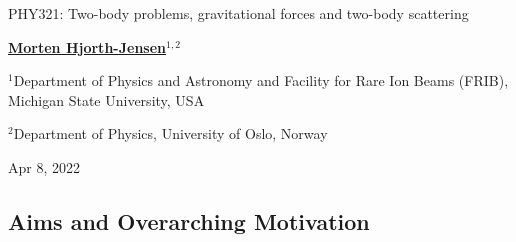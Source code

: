 \documentclass[%
oneside,                 %
final,                   %
10pt]{article}
\begin{document}

\newcommand{\exercisesection}[1]{\subsection*{#1}}






\thispagestyle{empty}

\begin{center}
{\LARGE\bf
\begin{spacing}{1.25}
PHY321: Two-body problems, gravitational forces and two-body scattering 
\end{spacing}
}
\end{center}


\begin{center}
{\bf \href{{http://mhjgit.github.io/info/doc/web/}}{Morten Hjorth-Jensen}${}^{1, 2}$} \\ [0mm]
\end{center}

\begin{center}
\centerline{{\small ${}^1$Department of Physics and Astronomy and Facility for Rare Ion Beams (FRIB), Michigan State University, USA}}
\centerline{{\small ${}^2$Department of Physics, University of Oslo, Norway}}
\end{center}
    

\begin{center}
Apr 8, 2022
\end{center}

\vspace{1cm}


\subsection{Aims and Overarching Motivation}
\end{document}
